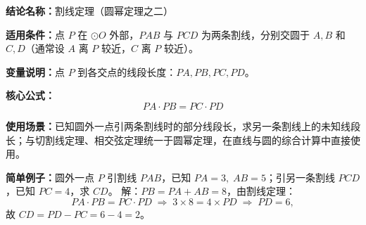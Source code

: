 \textbf{结论名称：}割线定理（圆幂定理之二）

\textbf{适用条件：}点 \(P\) 在 \(\odot O\) 外部，\(PAB\) 与 \(PCD\) 为两条割线，分别交圆于 \(A,B\) 和 \(C,D\)（通常设 \(A\) 离 \(P\) 较近，\(C\) 离 \(P\) 较近）。

\textbf{变量说明：}点 \(P\) 到各交点的线段长度：\(PA, PB, PC, PD\)。

\textbf{核心公式：}
\[
\boxed{PA \cdot PB = PC \cdot PD}
\]

\textbf{使用场景：}已知圆外一点引两条割线时的部分线段长，求另一条割线上的未知线段长；与切割线定理、相交弦定理统一于圆幂定理，在直线与圆的综合计算中直接使用。

\textbf{简单例子：}圆外一点 \(P\) 引割线 \(PAB\)，已知 \(PA=3,\;AB=5\)；引另一条割线 \(PCD\)，已知 \(PC=4\)，求 \(CD\)。
解：\(PB = PA+AB = 8\)，由割线定理：
\[
PA \cdot PB = PC \cdot PD \;\Longrightarrow\; 3 \times 8 = 4 \times PD \;\Longrightarrow\; PD = 6,
\]
故 \(CD = PD - PC = 6 - 4 = 2\)。